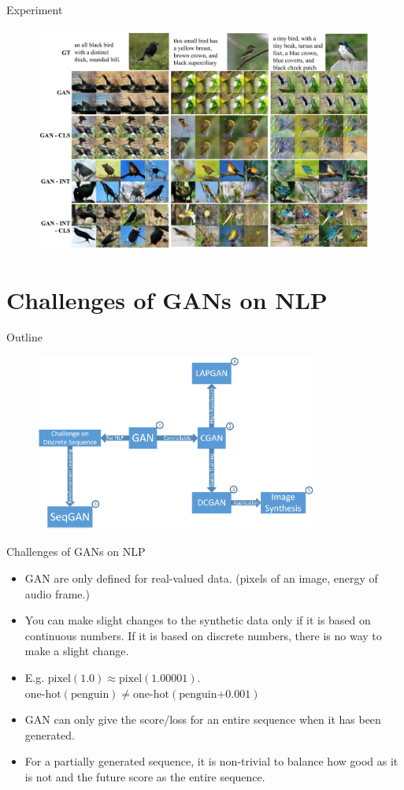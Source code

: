 \documentclass[10pt]{beamer}
\newcommand{\subtitlepage}[3]{\title{#1}\subtitle{#2}\author{#3}\date{}\begin{frame}[plain]\titlepage\end{frame}}
\begin{document}
	\begin{frame}{Experiment}
		\begin{figure}
			\includegraphics[width=30em]{figures/image-synthesis-experiment.PNG}
		\end{figure}
	\end{frame}
	
	\part{Challenges of GANs on NLP}
	\begin{frame}{Outline}
		\begin{figure}
			\includegraphics[width=25em]{figures/outline.png}
		\end{figure}
	\end{frame}
	\subtitlepage{}{Challenges of GANs on NLP}{}
	\begin{frame}{Challenges of GANs on NLP}
		\begin{itemize}
			\pause
			\item GAN are only defined for real-valued data. (pixels of an image, energy of audio frame.)
			\pause
			\item You can make slight changes to the synthetic data only if it is based on continuous numbers. If it is based on discrete numbers, there is no way to make a slight change.
			\pause
			\item E.g. $\text{pixel}(1.0)\approx\text{pixel}(1.00001)$. $\text{one-hot}(\text{penguin})\neq\text{one-hot}(\text{penguin+0.001})$
			\pause
			\item GAN can only give the score/loss for an entire sequence when it has been generated.
			\pause
			\item For a partially generated sequence, it is non-trivial to balance how good as it is not and the future score as the entire sequence.
		\end{itemize}
	\end{frame}
\end{document}
